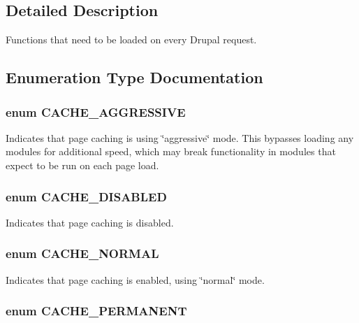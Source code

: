 \subsection{Detailed Description}
Functions that need to be loaded on every Drupal request. 

\subsection{Enumeration Type Documentation}
\hypertarget{bootstrap_8inc_c48cd3663e21507376bbbe62d3436223}{
\subsubsection[{CACHE\_\-AGGRESSIVE}]{\setlength{\rightskip}{0pt plus 5cm}enum {\bf CACHE\_\-AGGRESSIVE}}}
\label{bootstrap_8inc_c48cd3663e21507376bbbe62d3436223}


Indicates that page caching is using \char`\"{}aggressive\char`\"{} mode. This bypasses loading any modules for additional speed, which may break functionality in modules that expect to be run on each page load. \hypertarget{bootstrap_8inc_14fac00bc515c0931ce0a5b0193e00c0}{
\subsubsection[{CACHE\_\-DISABLED}]{\setlength{\rightskip}{0pt plus 5cm}enum {\bf CACHE\_\-DISABLED}}}
\label{bootstrap_8inc_14fac00bc515c0931ce0a5b0193e00c0}


Indicates that page caching is disabled. \hypertarget{bootstrap_8inc_068072633e0369efaf063d814bdacf9a}{
\subsubsection[{CACHE\_\-NORMAL}]{\setlength{\rightskip}{0pt plus 5cm}enum {\bf CACHE\_\-NORMAL}}}
\label{bootstrap_8inc_068072633e0369efaf063d814bdacf9a}


Indicates that page caching is enabled, using \char`\"{}normal\char`\"{} mode. \hypertarget{bootstrap_8inc_d987330fff5fa7c75800762ddedf300c}{
\subsubsection[{CACHE\_\-PERMANENT}]{\setlength{\rightskip}{0pt plus 5cm}enum {\bf CACHE\_\-PERMANENT}}}
\label{bootstrap_8inc_d987330fff5fa7c75800762ddedf300c}


